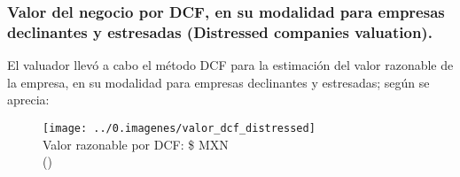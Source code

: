
\subsubsection{Valor del negocio por DCF, en su modalidad para empresas declinantes y estresadas (Distressed companies valuation).}

 El valuador llev\'o a cabo el m\'etodo DCF para la estimaci\'on del valor razonable de la empresa, en su modalidad para empresas declinantes y estresadas; seg\'un se aprecia: 

\begin{figure}[H]
\centering
\texttt{[image: ../0.imagenes/valor\_dcf\_distressed]}\\

Valor razonable por DCF: \textcolor{principal}{\$\valorDCF{} MXN}\\
(\textcolor{principal}{\valorDCFLetra})
\end{figure}